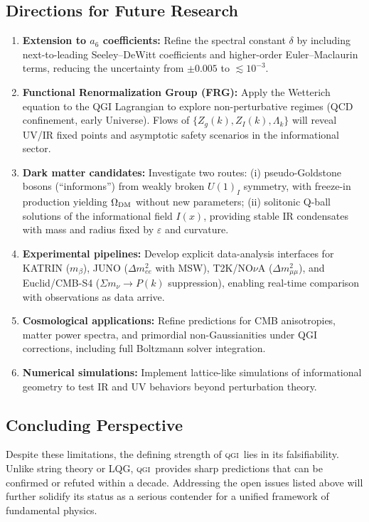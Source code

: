 \documentclass{article}
\numberwithin{equation}{section}
\theoremstyle{plain}
\theoremstyle{definition}
\theoremstyle{remark}
\newcommand{\qgi}{\textsc{qgi}}
\begin{document}
\subsection{Directions for Future Research}
\begin{enumerate}
    \item \textbf{Extension to $a_6$ coefficients:} Refine the spectral constant $\delta$ by including next-to-leading Seeley--DeWitt coefficients and higher-order Euler--Maclaurin terms, reducing the uncertainty from $\pm 0.005$ to $\lesssim 10^{-3}$.
    \item \textbf{Functional Renormalization Group (FRG):} Apply the Wetterich equation to the QGI Lagrangian to explore non-perturbative regimes (QCD confinement, early Universe). Flows of $\{Z_g(k), Z_I(k), \Lambda_k\}$ will reveal UV/IR fixed points and asymptotic safety scenarios in the informational sector.
    \item \textbf{Dark matter candidates:} Investigate two routes: (i) pseudo-Goldstone bosons (``informons'') from weakly broken $U(1)_I$ symmetry, with freeze-in production yielding $\Omega_{\rm DM}$ without new parameters; (ii) solitonic Q-ball solutions of the informational field $I(x)$, providing stable IR condensates with mass and radius fixed by $\varepsilon$ and curvature.
    \item \textbf{Experimental pipelines:} Develop explicit data-analysis interfaces for KATRIN ($m_\beta$), JUNO ($\Delta m_{ee}^2$ with MSW), T2K/NO$\nu$A ($\Delta m_{\mu\mu}^2$), and Euclid/CMB-S4 ($\Sigma m_\nu \to P(k)$ suppression), enabling real-time comparison with observations as data arrive.
    \item \textbf{Cosmological applications:} Refine predictions for CMB anisotropies, matter power spectra, and primordial non-Gaussianities under QGI corrections, including full Boltzmann solver integration.
    \item \textbf{Numerical simulations:} Implement lattice-like simulations of informational geometry to test IR and UV behaviors beyond perturbation theory.
\end{enumerate}

\subsection{Concluding Perspective}
Despite these limitations, the defining strength of \qgi\ lies in its falsifiability. Unlike string theory or LQG, \qgi\ provides sharp predictions that can be confirmed or refuted within a decade. Addressing the open issues listed above will further solidify its status as a serious contender for a unified framework of fundamental physics.
\end{document}
